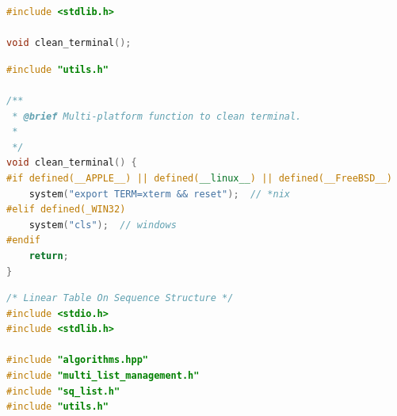 \documentclass[supercite]{Experimental_Report}
\theoremstyle{definition}
\begin{document}
\begin{lstlisting}[caption={$utils.h$}, language=C++, frame=single]
#include <stdlib.h>

void clean_terminal();
\end{lstlisting}

\begin{lstlisting}[caption={$utils.cpp$}, language=C++, frame=single]
#include "utils.h"

/**
 * @brief Multi-platform function to clean terminal.
 *
 */
void clean_terminal() {
#if defined(__APPLE__) || defined(__linux__) || defined(__FreeBSD__)
    system("export TERM=xterm && reset");  // *nix
#elif defined(_WIN32)
    system("cls");  // windows
#endif
    return;
}
\end{lstlisting}

\begin{lstlisting}[caption={$main.cpp$}, language=C++, frame=single]
/* Linear Table On Sequence Structure */
#include <stdio.h>
#include <stdlib.h>

#include "algorithms.hpp"
#include "multi_list_management.h"
#include "sq_list.h"
#include "utils.h"


\end{lstlisting}
\end{document}
